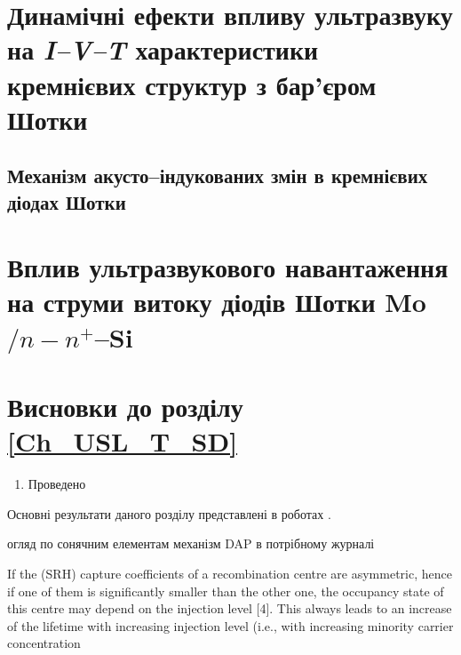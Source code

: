 \documentclass[a4paper,14pt,oneside,openany]{memoir}
\begin{document}
\section{Динамічні ефекти впливу ультразвуку на \emph{I--V--T} характеристики кремнієвих структур з бар'єром Шотки\label{SSDB:Forw}}

\cite{MirzadeR,ZobovFTP2008,Teterkin2009r,Pashaev2014r,YOlikhTPL2011r,Vlasov2009r,Vlasenko2000r,VI:Luc,PF:ZhdanovaR}



\subsection{Механізм акусто--індукованих змін в кремнієвих діодах Шотки}

\section{Вплив ультразвукового навантаження на струми витоку діодів Шотки Mo$/n-n^+$--Si\label{SSDB:Rev}}



\section*{Висновки до розділу \ref{Ch_USL_T_SD}}
  \begin{enumerate}
     \item Проведено
  \end{enumerate}	

Основні результати даного розділу представлені в роботах \cite{Olikh:UPJ2014,OlikhJAP,Olikh:Ultras2016,Olikh2016JSem,
8Drog,2014IUSOl,2015ICU,7UNCPS}.












огляд по сонячним елементам \cite{Breitenstein2013}
механізм DAP в потрібному журналі \cite{CDLR:SupMicr}


If the  (SRH) capture coefficients of a recombination centre
are asymmetric, hence if one of them is significantly smaller
than the other one, the occupancy state of this centre may
depend on the injection level [4]. This always leads to an
increase of the lifetime with increasing injection level (i.e.,
with increasing minority carrier concentration \cite{Breitenstein2013,TauOnIph}
\end{document}
